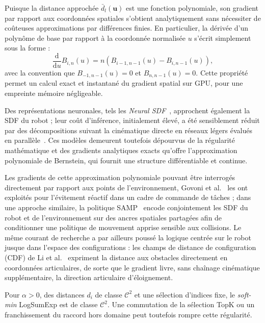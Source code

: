 Puisque la distance approchée $\bar{d}_l(\mathbf{u})$ est une fonction polynomiale, son gradient par rapport aux coordonnées spatiales s'obtient analytiquement sans nécessiter de coûteuses approximations par différences finies. En particulier, la dérivée d'un polynôme de base par rapport à la coordonnée normalisée $u$ s'écrit simplement sous la forme :
\begin{equation}
\label{eq:deriv_bernstein}
\frac{\mathrm{d}}{\mathrm{d}u} B_{i,n}(u) = n \left( B_{i-1,n-1}(u) - B_{i,n-1}(u) \right),
\end{equation}
avec la convention que $B_{-1,n-1}(u) = 0$ et $B_{n,n-1}(u) = 0$. Cette propriété permet un calcul exact et instantané du gradient spatial sur \ac{GPU}, pour une empreinte mémoire négligeable.

Des représentations neuronales, tels les \textit{Neural \ac{SDF}}~\cite{Liu2023Collision}, approchent également la \ac{SDF} du robot ; leur coût d'inférence, initialement élevé, a été sensiblement réduit par des décompositions suivant la cinématique directe en réseaux légers évalués en parallèle~\cite{Zhu2025Efficient}. Ces modèles demeurent toutefois dépourvus de la régularité mathématique et des gradients analytiques exacts qu'offre l'approximation polynomiale de Bernstein, qui fournit une structure différentiable et continue.

Les gradients de cette approximation polynomiale pouvant être interrogés directement par rapport aux points de l'environnement, Govoni et al.~\cite{Govoni2026rdf} les ont exploités pour l'évitement réactif dans un cadre de commande de tâches ; dans une approche similaire, la politique SAMP~\cite{Chen2025Samp} encode conjointement les \ac{SDF} du robot et de l'environnement sur des ancres spatiales partagées afin de conditionner une politique de mouvement apprise sensible aux collisions. Le même courant de recherche a par ailleurs poussé la logique centrée sur le robot jusque dans l'espace des configurations : les champs de distance de configuration (\ac{CDF}) de Li et al.~\cite{Li2024Configuration} expriment la distance aux obstacles directement en coordonnées articulaires, de sorte que le gradient livre, sans chaînage cinématique supplémentaire, la direction articulaire d'éloignement.

Pour $\alpha>0$, des distances $d_i$ de classe $\mathcal{C}^2$ et une sélection d'indices fixe, le \textit{soft-min} LogSumExp est de classe $\mathcal{C}^2$. Une commutation de la sélection TopK ou un franchissement du raccord hors domaine peut toutefois rompre cette régularité.


